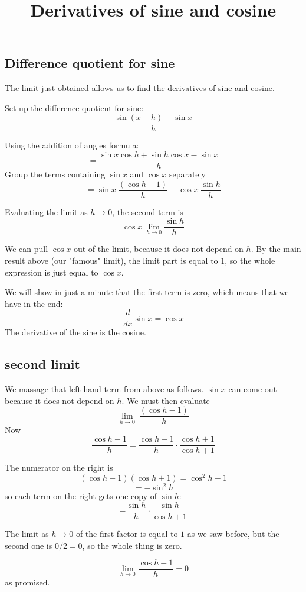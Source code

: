 \documentclass[11pt, oneside]{article}
\title{Derivatives of sine and cosine}
\date{}
\begin{document}
\maketitle
\Large

\subsection*{Difference quotient for sine}
The limit just obtained allows us to find the derivatives of sine and cosine.  

Set up the difference quotient for sine:
\[  \frac{\sin (x + h) - \sin x}{h} \]

Using the addition of angles formula:
\[ = \frac{\sin x \cos h + \sin h \cos x - \sin x}{h} \]
Group the terms containing $\sin x$ and $\cos x$ separately
\[ = \sin x \ \frac{(\cos h - 1)}{h} + \cos x \ \frac{\sin h}{h} \]

Evaluating the limit as $h \rightarrow 0$, the second term is
\[ \cos x \ \lim_{h \rightarrow 0} \frac{\sin h}{h} \]

We can pull $\cos x$ out of the limit, because it does not depend on $h$.  By the main result above (our "famous" limit), the limit part is equal to $1$, so the whole expression is just equal to $\cos x$.

We will show in just a minute that the first term is zero, which means that we have in the end:
\[ \frac{d}{dx} \sin x = \cos x \]
The derivative of the sine is the cosine.

\subsection*{second limit}

We massage that left-hand term from above as follows.  $\sin x$ can come out because it does not depend on $h$.  We must then evaluate
\[ \lim_{h \rightarrow 0} \ \frac{(\cos h - 1)}{h} \]
Now
\[ \frac{\cos h - 1}{h}  =  \frac{\cos h - 1}{h}  \cdot \frac{\cos h + 1}{\cos h + 1} \]

The numerator on the right is
\[ (\cos h - 1)(\cos h + 1) = \cos^2 h - 1 \]
\[ = -\sin^2 h \]
so each term on the right gets one copy of $\sin h$:
\[  - \frac{\sin h}{h} \cdot \frac{\sin h}{\cos h + 1} \]

The limit as $h \rightarrow 0$ of the first factor is equal to $1$ as we saw before, but the second one is $0/2 = 0$, so the whole thing is zero.

\[ \lim_{h \rightarrow 0} \frac{\cos h - 1}{h} = 0 \]
as promised.
\end{document}
